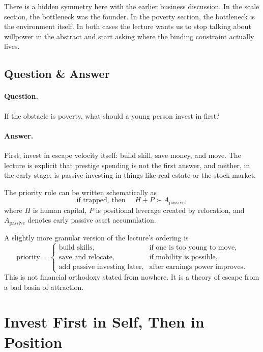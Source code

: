 There is a hidden symmetry here with the earlier business discussion. In the scale section, the bottleneck was the founder. In the poverty section, the bottleneck is the environment itself. In both cases the lecture wants us to stop talking about willpower in the abstract and start asking where the binding constraint actually lives.

\subsection{Question \& Answer}

\paragraph{Question.} If the obstacle is poverty, what should a young person invest in first?

\paragraph{Answer.} First, invest in escape velocity itself: build skill, save money, and move. The lecture is explicit that prestige spending is not the first answer, and neither, in the early stage, is passive investing in things like real estate or the stock market.

The priority rule can be written schematically as
\begin{equation}
\text{if trapped, then } \quad H + P \succ A_{\text{passive}},
\end{equation}
where \(H\) is human capital, \(P\) is positional leverage created by relocation, and \(A_{\text{passive}}\) denotes early passive asset accumulation.

A slightly more granular version of the lecture's ordering is
\begin{equation}
\text{priority}=
\begin{cases}
\text{build skills}, & \text{if one is too young to move},\\
\text{save and relocate}, & \text{if mobility is possible},\\
\text{add passive investing later}, & \text{after earnings power improves}.
\end{cases}
\end{equation}
This is not financial orthodoxy stated from nowhere. It is a theory of escape from a bad basin of attraction.

\section{Invest First in Self, Then in Position}

